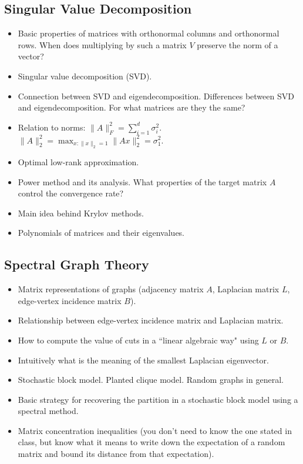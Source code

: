\documentclass[10pt]{article}
\begin{document}
\subsection{Singular Value Decomposition}
\begin{itemize}
	\item Basic properties of matrices with orthonormal columns and orthonormal rows. When does multiplying by such a matrix $V$ preserve the norm of a vector?
	\item Singular value decomposition (SVD).
	\item Connection between SVD and eigendecomposition. Differences between SVD and eigendecomposition. For what matrices are they the same?
	\item Relation to norms: $\|A\|_F^2 = \sum_{i=1}^d \sigma_i^2$. $\|A\|_2^2 = \max_{x: \|x\|_2 = 1} \|Ax\|_2^2 = \sigma_1^2$.
	\item Optimal low-rank approximation. 
	\item Power method and its analysis. What properties of the target matrix $A$ control the convergence rate?
	\item Main idea behind Krylov methods. 
	\item Polynomials of matrices and their eigenvalues.
\end{itemize}

\subsection{Spectral Graph Theory}
\begin{itemize}
	\item Matrix representations of graphs (adjacency matrix  ${A}$, Laplacian matrix  ${L}$, edge-vertex incidence matrix ${B}$).
	\item Relationship between edge-vertex incidence matrix and Laplacian matrix.
	\item How to compute the value of cuts in a ``linear algebraic way" using $L$ or $B$. 
	\item Intuitively what is the meaning of the smallest Laplacian eigenvector.
	\item Stochastic block model. Planted clique model. Random graphs in general.
	\item Basic strategy for recovering the partition in a stochastic block model using a spectral method.
	\item Matrix concentration inequalities (you don't need to know the one stated in class, but know what it means to write down the expectation of a random matrix and bound its distance from that expectation).
\end{itemize}
\end{document}
